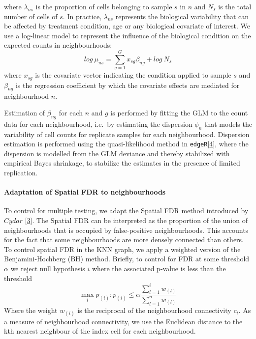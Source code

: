 \documentclass[
]{article}
\begin{document}
where \(\lambda_{ns}\) is the proportion of cells belonging to sample \(s\) in \(n\) and \(N_s\) is the total number of cells of \(s\). In practice, \(\lambda_{ns}\) represents the biological variability that can be affected by treatment condition, age or any biological covariate of interest. We use a log-linear model to represent the influence of the biological condition on the expected counts in neighbourhoods:
\[
log\ \mu_{ns} = \sum_{g=1}^{G}x_{sg}\beta_{ng} + log\ N_s
\]
where \(x_{sg}\) is the covariate vector indicating the condition applied to sample \(s\) and \(\beta_{ng}\) is the regression coefficient by which the covariate effects are mediated for neighbourhood \(n\).

Estimation of \(\beta_{ng}\) for each \(n\) and \(g\) is performed by fitting the GLM to the count data for each neighbourhood, i.e.~by estimating the dispersion \(\phi_{n}\) that models the variability of cell counts for replicate samples for each neighbourhood. Dispersion estimation is performed using the quasi-likelihood method in \texttt{edgeR}{[}\protect\hyperlink{ref-robinsonEdgeRBioconductorPackage2010a}{4}{]}, where the dispersion is modelled from the GLM deviance and thereby stabilized with empirical Bayes shrinkage, to stabilize the estimates in the presence of limited replication.

\hypertarget{adaptation-of-spatial-fdr-to-neighbourhoods}{%
\paragraph*{Adaptation of Spatial FDR to neighbourhoods}\label{adaptation-of-spatial-fdr-to-neighbourhoods}}

To control for multiple testing, we adapt the Spatial FDR method introduced by \(Cydar\) {[}\protect\hyperlink{ref-lunTestingDifferentialAbundance2017}{3}{]}. The Spatial FDR can be interpreted as the proportion of the union of neighbourhoods that is occupied by false-positive neighbourhoods. This accounts for the fact that some neighbourhoods are more densely connected than others. To control spatial FDR in the KNN graph, we apply a weighted version of the Benjamini-Hochberg (BH) method. Briefly, to control for FDR at some threshold \(\alpha\) we reject null hypothesis \(i\) where the associated p-value is less than the threshold
\[
\max_i{p_{(i)}: p_{(i)}\le \alpha\frac{\sum_{l=1}^{i}w_{(l)}}{\sum_{l=1}^{n}w_{(l)}}}
\]
Where the weight \(w_{(i)}\) is the reciprocal of the neighbourhood connectivity \(c_i\). As a measure of neighbourhood connectivity, we use the Euclidean distance to the kth nearest neighbour of the index cell for each neighbourhood.
\end{document}

